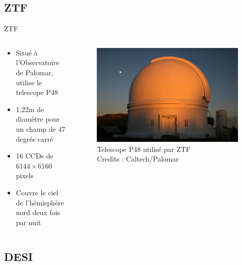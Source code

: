 \documentclass{beamer}
\newcommand{\credits}[1]{\tiny Credits : #1}
\begin{document}
\subsection{ZTF}
\begin{frame}{ZTF}
\begin{columns}
\begin{column}{.5\textwidth}
	\begin{itemize}
		\item Situé à l'Observatoire de Palomar, utilise le telescope P48
		\item 1,22m de diamètre pour un champ de 47 degrés carré
		\item 16 CCDs de $6144 \times 6160$ pixels
		\item Couvre le ciel de l'hémisphère nord deux fois par nuit
	\end{itemize}
\end{column}

\begin{column}{.5\textwidth}
	\begin{figure}
		\centering
		\includegraphics[width=.9\textwidth]{figures/ZTF_dome.jpg}
		\caption{Telescope P48 utilisé par ZTF \\ \credits{Caltech/Palomar}}
	\end{figure}
\end{column}
\end{columns}

\end{frame}

\subsection{DESI}
\end{document}
